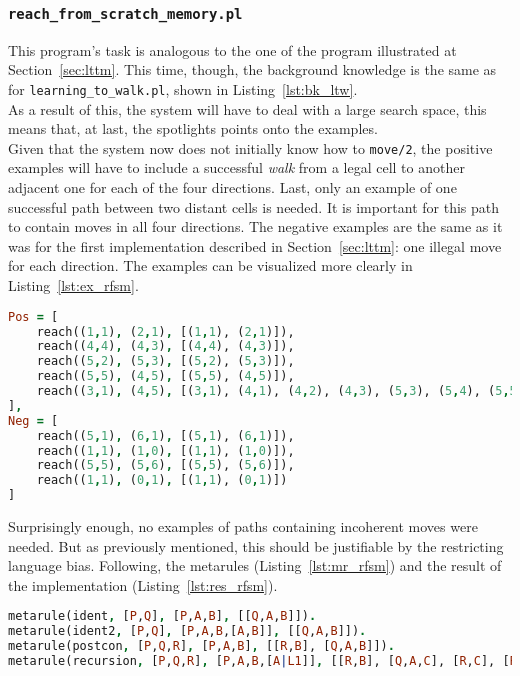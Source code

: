 \subsubsection{\texttt{reach\_from\_scratch\_memory.pl}}
This program's task is analogous to the one of the program illustrated at Section~\ref{sec:lttm}. This time, though, the
background knowledge is the same as for \texttt{learning\_to\_walk.pl}, shown in Listing~\ref{lst:bk_ltw}.\\
As a result of this, the system will have to deal with a large search space, this means that, at last, the spotlights points
onto the examples.\\
Given that the system now does not initially know how to \texttt{move/2}, the positive examples will have to include a successful
\emph{walk} from a legal cell to another adjacent one for each of the four directions. Last, only an example of one successful path
between two distant cells is needed. It is important for this path to contain moves in all four directions.
The negative examples are the same as it was for the first implementation described in Section~\ref{sec:lttm}: one illegal move for each
direction. The examples can be visualized more clearly in Listing~\ref{lst:ex_rfsm}.
\begin{lstlisting}[label={lst:ex_rfsm},language=Prolog, caption=Examples in \texttt{reach\_from\_scratch\_memory.pl}, belowcaptionskip=1cm]
Pos = [
    reach((1,1), (2,1), [(1,1), (2,1)]),
    reach((4,4), (4,3), [(4,4), (4,3)]),
    reach((5,2), (5,3), [(5,2), (5,3)]),
    reach((5,5), (4,5), [(5,5), (4,5)]),
    reach((3,1), (4,5), [(3,1), (4,1), (4,2), (4,3), (5,3), (5,4), (5,5), (4,5)])
],
Neg = [
    reach((5,1), (6,1), [(5,1), (6,1)]),
    reach((1,1), (1,0), [(1,1), (1,0)]),
    reach((5,5), (5,6), [(5,5), (5,6)]),
    reach((1,1), (0,1), [(1,1), (0,1)])
]
\end{lstlisting}
Surprisingly enough, no examples of paths containing incoherent moves were needed.
But as previously mentioned, this should be justifiable by the restricting language bias.
Following, the metarules (Listing~\ref{lst:mr_rfsm}) and the result of the implementation (Listing~\ref{lst:res_rfsm}).
\begin{lstlisting}[label={lst:mr_rfsm},language=Prolog, caption=Metarules in \texttt{reach\_from\_scratch\_memory.pl}, belowcaptionskip=1cm]
metarule(ident, [P,Q], [P,A,B], [[Q,A,B]]).
metarule(ident2, [P,Q], [P,A,B,[A,B]], [[Q,A,B]]).
metarule(postcon, [P,Q,R], [P,A,B], [[R,B], [Q,A,B]]).
metarule(recursion, [P,Q,R], [P,A,B,[A|L1]], [[R,B], [Q,A,C], [R,C], [P,C,B,L1]]).
\end{lstlisting}
